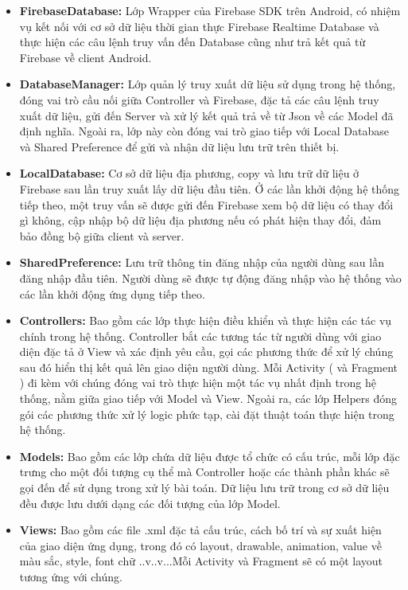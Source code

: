 \begin{itemize}
	\item \textbf{FirebaseDatabase: }Lớp Wrapper của Firebase SDK trên Android, có nhiệm vụ kết nối với cơ sở dữ liệu thời gian thực Firebase Realtime Database và thực hiện các câu lệnh truy vấn đến Database cũng như trả kết quả từ Firebase về client Android.
	\item \textbf{DatabaseManager: }Lớp quản lý truy xuất dữ liệu sử dụng trong hệ thống, đóng vai trò cầu nối giữa Controller và Firebase, đặc tả các câu lệnh truy xuất dữ liệu, gửi đến Server và xử lý kết quả trả về từ Json về các Model đã định nghĩa. Ngoài ra, lớp này còn đóng vai trò giao tiếp với Local Database và Shared Preference để gửi và nhận dữ liệu lưu trữ trên thiết bị. 
	\item \textbf{LocalDatabase: } Cơ sở dữ liệu địa phương, copy và lưu trữ dữ liệu ở Firebase sau lần truy xuất lấy dữ liệu đầu tiên. Ở các lần khởi động hệ thống tiếp theo, một truy vấn sẽ được gửi đến Firebase xem bộ dữ liệu có thay đổi gì không, cập nhập bộ dữ liệu địa phương nếu có phát hiện thay đổi, đảm bảo đồng bộ giữa client và server.
	\item \textbf{SharedPreference: } Lưu trữ thông tin đăng nhập của người dùng sau lần đăng nhập đầu tiên. Người dùng sẽ được tự động đăng nhập vào hệ thống vào các lần khởi động ứng dụng tiếp theo.
	\item \textbf{Controllers: } Bao gồm các lớp thực hiện điều khiển và thực hiện các tác vụ chính trong hệ thống. Controller bắt các tương tác từ người dùng với giao diện đặc tả ở View và xác định yêu cầu, gọi các phương thức để xử lý chúng sau đó hiển thị kết quả lên giao diện người dùng. Mỗi Activity ( và Fragment ) đi kèm với chúng đóng vai trò thực hiện một tác vụ nhất định trong hệ thống, nằm giữa giao tiếp với Model và View. Ngoài ra, các lớp Helpers đóng gói các phương thức xử lý logic phức tạp, cài đặt thuật toán thực hiện trong hệ thống.   	
	\item \textbf{Models: } Bao gồm các lớp chứa dữ liệu được tổ chức có cấu trúc, mỗi lớp đặc trưng cho một đối tượng cụ thể mà Controller hoặc các thành phần khác sẽ gọi đến để sử dụng trong xử lý bài toán. Dữ liệu lưu trữ trong cơ sở dữ liệu đều được lưu dưới dạng các đối tượng của lớp Model.
	\item \textbf{Views: } Bao gồm các file .xml đặc tả cấu trúc, cách bố trí và sự xuất hiện của giao diện ứng dụng, trong đó có layout, drawable, animation, value về màu sắc, style, font chữ ..v..v...Mỗi Activity và Fragment sẽ có một layout tương ứng với chúng.	 
\end{itemize}
\pagebreak
